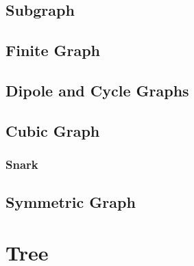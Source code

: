 \subsection{Subgraph} \label{sec:subgraphs}

\subsection{Finite Graph} \label{sec:finite_graph}

\subsection{Dipole and Cycle Graphs} \label{sec:dipole_cycle_graph}

\subsection{Cubic Graph} \label{sec:cubic_graph}

\subsubsection{Snark} \label{sec:snark}



\subsection{Symmetric Graph} \label{sec:symmetric_graph}



\section{Tree} \label{sec:tree}

